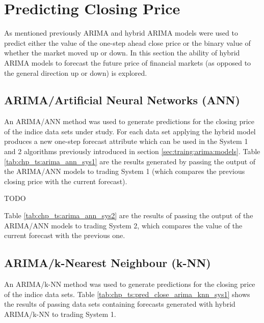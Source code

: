 \section{Predicting Closing Price}
As mentioned previously ARIMA and hybrid ARIMA models were used to predict either the value of the one-step ahead close price or the binary value of whether the market moved up or down. In this section the ability of hybrid ARIMA models to forecast the future price of financial markets (as opposed to the general direction up or down) is explored.

\subsection{ARIMA/Artificial Neural Networks (ANN)}
An ARIMA/ANN method was used to generate predictions for the closing price of the indice data sets under study. For each data set applying the hybrid model produces a new one-step forecast attribute which can be used in the System 1 and 2 algorithms previously introduced in section \ref{sec:traing:arima:models}. Table \ref{tab:chp_ts:arima_ann_sys1} are the results generated by passing the output of the ARIMA/ANN models to trading System 1 (which compares the previous closing price with the current forecast).

TODO
\label{todo:chp5:tab:chp_ts:arima_hybrid_reg}



Table \ref{tab:chp_ts:arima_ann_sys2} are the results of passing the output of the ARIMA/ANN models to trading System 2, which compares the value of the current forecast with the previous one.



\subsection{ARIMA/k-Nearest Neighbour (k-NN)}
An ARIMA/k-NN method was used to generate predictions for the closing price of the indice data sets. Table \ref{tab:chp_ts:pred_close_arima_knn_sys1} shows the results of passing data sets containing forecasts generated with hybrid ARIMA/k-NN to trading System 1.



